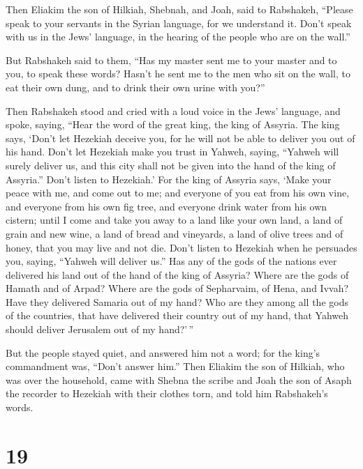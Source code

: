  Then Eliakim the son of Hilkiah, Shebnah, and Joah, said
to Rabshakeh, ``Please speak to your servants in the Syrian language,
for we understand it. Don't speak with us in the Jews' language, in the
hearing of the people who are on the wall.''

 But Rabshakeh said to them, ``Has my master sent me to
your master and to you, to speak these words? Hasn't he sent me to the
men who sit on the wall, to eat their own dung, and to drink their own
urine with you?''

 Then Rabshakeh stood and cried with a loud voice in the
Jews' language, and spoke, saying, ``Hear the word of the great king,
the king of Assyria.  The king says, `Don't let Hezekiah
deceive you, for he will not be able to deliver you out of his hand.
 Don't let Hezekiah make you trust in Yahweh, saying,
``Yahweh will surely deliver us, and this city shall not be given into
the hand of the king of Assyria.''  Don't listen to
Hezekiah.' For the king of Assyria says, `Make your peace with me, and
come out to me; and everyone of you eat from his own vine, and everyone
from his own fig tree, and everyone drink water from his own cistern;
 until I come and take you away to a land like your own
land, a land of grain and new wine, a land of bread and vineyards, a
land of olive trees and of honey, that you may live and not die. Don't
listen to Hezekiah when he persuades you, saying, ``Yahweh will deliver
us.''  Has any of the gods of the nations ever delivered
his land out of the hand of the king of Assyria?  Where
are the gods of Hamath and of Arpad? Where are the gods of Sepharvaim,
of Hena, and Ivvah? Have they delivered Samaria out of my hand?
 Who are they among all the gods of the countries, that
have delivered their country out of my hand, that Yahweh should deliver
Jerusalem out of my hand?'\,''

 But the people stayed quiet, and answered him not a
word; for the king's commandment was, ``Don't answer him.''
 Then Eliakim the son of Hilkiah, who was over the
household, came with Shebna the scribe and Joah the son of Asaph the
recorder to Hezekiah with their clothes torn, and told him Rabshakeh's
words.

\hypertarget{section-18}{%
\section{19}\label{section-18}}

